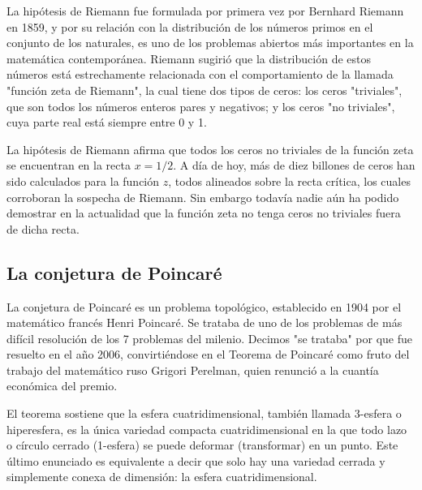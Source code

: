 La hipótesis de Riemann fue formulada por primera vez por Bernhard Riemann en
1859, y por su relación con la distribución de los números primos en el conjunto
de los naturales, es uno de los problemas abiertos más importantes en la
matemática contemporánea. Riemann sugirió que la distribución de estos números
está estrechamente relacionada con el comportamiento de la llamada "función zeta
de Riemann", la cual tiene dos tipos de ceros: los ceros "triviales", que son
todos los números enteros pares y negativos; y los ceros "no triviales", cuya
parte real está siempre entre 0 y 1.

La hipótesis de Riemann afirma que todos los ceros no triviales de la función
zeta se encuentran en la recta $x = 1/2$. A día de hoy, más de diez billones de
ceros han sido calculados para la función $z$, todos alineados sobre la recta
crítica, los cuales corroboran la sospecha de Riemann. Sin embargo todavía nadie
aún ha podido demostrar en la actualidad que la función zeta no tenga ceros no
triviales fuera de dicha recta.

\subsection{La conjetura de Poincaré}

La conjetura de Poincaré es un problema topológico, establecido en 1904 por el
matemático francés Henri Poincaré. Se trataba de uno de los problemas de más
difícil resolución de los 7 problemas del milenio. Decimos "se trataba" por que
fue resuelto en el año 2006, convirtiéndose en el Teorema de Poincaré como fruto
del trabajo del matemático ruso Grigori Perelman, quien renunció a la cuantía
económica del premio.

El teorema sostiene que la esfera cuatridimensional, también llamada 3-esfera o
hiperesfera, es la única variedad compacta cuatridimensional en la que todo lazo
o círculo cerrado (1-esfera) se puede deformar (transformar) en un punto. Este
último enunciado es equivalente a decir que solo hay una variedad cerrada y
simplemente conexa de dimensión: la esfera cuatridimensional.

